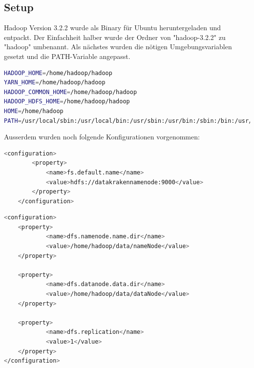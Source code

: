 \documentclass[12pt,twoside,a4paper,parskip]{scrbook}
\begin{document}
\subsection{Setup}
Hadoop Version 3.2.2 wurde als Binary für Ubuntu heruntergeladen und entpackt. Der Einfachheit halber wurde der Ordner von "hadoop-3.2.2" zu "hadoop" umbenannt.
Als nächstes wurden die nötigen Umgebungsvariablen gesetzt und die PATH-Variable angepasst. %
\begin{lstlisting}[caption=etc/environment,label=env,language=bash]
HADOOP_HOME=/home/hadoop/hadoop
YARN_HOME=/home/hadoop/hadoop
HADOOP_COMMON_HOME=/home/hadoop/hadoop
HADOOP_HDFS_HOME=/home/hadoop/hadoop
HOME=/home/hadoop
PATH=/usr/local/sbin:/usr/local/bin:/usr/sbin:/usr/bin:/sbin:/bin:/usr/games:/usr/local/games:/snap/bin:/bin:/home/hadoop/hadoop/bin:/home/hadoop/hadoop/sbin:/usr/lib/jvm/java-8-openjdk-amd64/bin:/usr/lib/jvm/java-8-openjdk-amd64/sbin
\end{lstlisting}
Ausserdem wurden noch folgende Konfigurationen vorgenommen: \newline
\begin{lstlisting}[caption=/hadoop/etc/hadoop/core-site.xml,label=coresitexml,language=bash]
<configuration>
        <property>
            <name>fs.default.name</name>
            <value>hdfs://datakrakennamenode:9000</value>
        </property>
    </configuration>
\end{lstlisting}
\begin{lstlisting}[caption=hadoop/etc/hadoop/hdfs-site.xml,label=hdfssitexml,language=bash]
<configuration>
    <property>
            <name>dfs.namenode.name.dir</name>
            <value>/home/hadoop/data/nameNode</value>
    </property>

    <property>
            <name>dfs.datanode.data.dir</name>
            <value>/home/hadoop/data/dataNode</value>
    </property>

    <property>
            <name>dfs.replication</name>
            <value>1</value>
    </property>
</configuration>
\end{lstlisting}
\end{document}
